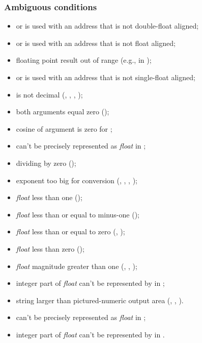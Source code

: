 \subsubsection{Ambiguous conditions} %
\label{float:ambiguous}
\begin{itemize}
\item {} or  is used with an address that is not
	double-float aligned;
\item {} or  is used with an address that is not
	float aligned;
\item floating point result out of range
	(e.g., in );
\item {} or  is used with an address that is not
	single-float aligned;
\item {} is not decimal
	(,
	 ,
	 ,
	 );
\item both arguments equal zero ();
\item cosine of argument is zero for ;
\item {} can't be precisely represented as \emph{float} in
	;
\item dividing by zero ();
\item exponent too big for conversion
	(,
	 ,
	 ,
	 );
\item \emph{float} less than one ();
\item \emph{float} less than or equal to minus-one
	();
\item \emph{float} less than or equal to zero
	(,
	 );
\item \emph{float} less than zero
	();
\item \emph{float} magnitude greater than one
	(,
	 ,
	 );
\item integer part of \emph{float} can't be represented by  in
	;
\item string larger than pictured-numeric output area
	(,
	 ,
	 ).
\item {} can't be precisely represented as
	\emph{float} in ;
\item integer part of \emph{float} can't be represented
	by  in .
\end{itemize}

